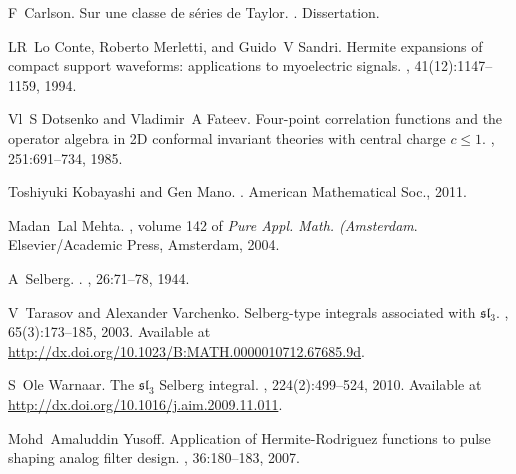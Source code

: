 
\begin{thebibliography}{CMS94}

F~Carlson.
\newblock Sur une classe de s\'eries de {T}aylor.
.
\newblock Dissertation.

LR~Lo Conte, Roberto Merletti, and Guido~V Sandri.
\newblock Hermite expansions of compact support waveforms: applications to
  myoelectric signals.
, 41(12):1147--1159,
  1994.

Vl~S Dotsenko and Vladimir~A Fateev.
\newblock Four-point correlation functions and the operator algebra in 2{D}
  conformal invariant theories with central charge $c\leq 1$.
, 251:691--734, 1985.

Toshiyuki Kobayashi and Gen Mano.
.
\newblock American Mathematical Soc., 2011.

Madan~Lal Mehta.
, volume 142 of {\em {\normalfont Pure Appl.
  Math. ({A}msterdam}}.
\newblock Elsevier/{A}cademic {P}ress, {A}msterdam, 2004.

A~Selberg.
.
, 26:71--78, 1944.

V~Tarasov and Alexander Varchenko.
\newblock Selberg-type integrals associated with $\mathfrak{sl}_3$.
, 65(3):173--185, 2003.
\newblock Available at
  \url{http://dx.doi.org/10.1023/B:MATH.0000010712.67685.9d}.

S~Ole Warnaar.
\newblock The $\mathfrak{sl}_3$ {S}elberg integral.
, 224(2):499--524, 2010.
\newblock Available at \url{http://dx.doi.org/10.1016/j.aim.2009.11.011}.

Mohd~Amaluddin Yusoff.
\newblock Application of {H}ermite-{R}odriguez functions to pulse shaping
  analog filter design.
,
  36:180--183, 2007.

\end{thebibliography}
